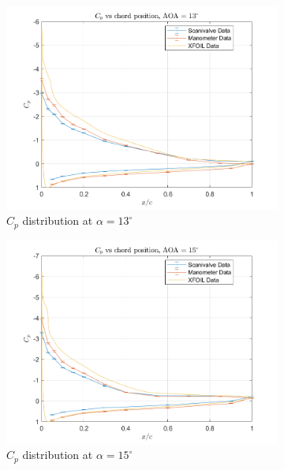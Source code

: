 \documentclass[runningheads]{llncs}
\begin{document}
\begin{figure}[H]
\begin{subfigure}[b]{0.3\textwidth}
        \includegraphics[width=\textwidth]{figures/AOA13.png}
        \caption{$C_p$ distribution at $\alpha = 13^\circ$}
        \label{fig:cp_13}
    \end{subfigure}
    \begin{subfigure}[b]{0.3\textwidth}
        \centering
        \includegraphics[width=\textwidth]{figures/AOA15.png}
        \caption{$C_p$ distribution at $\alpha = 15^\circ$}
        \label{fig:cp_15}
    \end{subfigure}
    \begin{subfigure}[b]{0.3\textwidth}
        \centering

\end{subfigure}
\end{figure}
\end{document}
